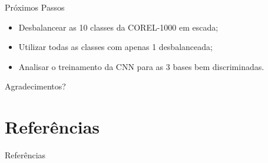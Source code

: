 \documentclass{beamer}
\begin{document}
\begin{frame}{Próximos Passos}
  \begin{itemize}
  \item Desbalancear as 10 classes da COREL-1000 em escada;
  \item Utilizar todas as classes com apenas 1 desbalanceada;
  \item Analisar o treinamento da CNN para as 3 bases bem discriminadas.
  \end{itemize}
\end{frame}
\begin{frame}{Agradecimentos?}
\end{frame}
\section{Referências}
\begin{frame}{Referências}
\end{frame}
\begin{frame}[plain]
  \maketitle
\end{frame}
\end{document}

